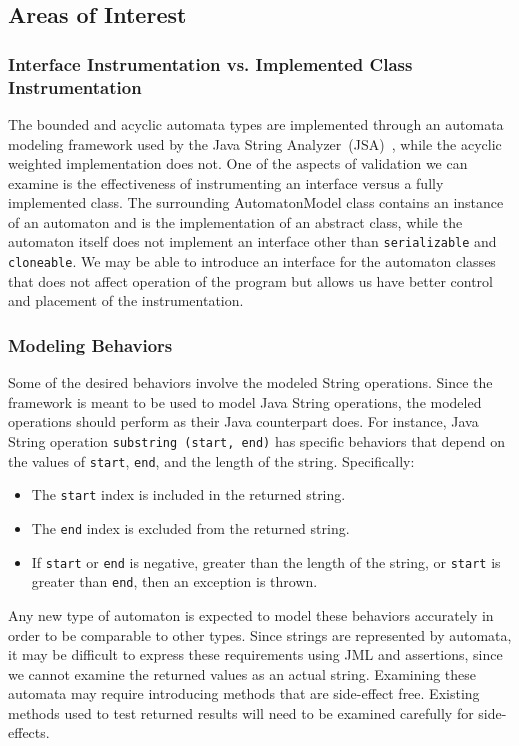 \documentclass[letterpaper,11pt,twocolumn]{article}
\begin{document}
\subsection{Areas of Interest}

\subsubsection{Interface Instrumentation vs. Implemented Class Instrumentation}

The bounded and acyclic automata types are implemented through an automata
modeling framework used by the Java String Analyzer~(JSA)~\cite{strings2003},
while the acyclic weighted implementation does not.  One of the aspects of
validation we can examine is the effectiveness of instrumenting an interface
versus a fully implemented class.  The surrounding AutomatonModel class
contains an instance of an automaton and is the implementation of an abstract
class, while the automaton itself does not implement an interface other than
\texttt{serializable} and \texttt{cloneable}.  We may be able to introduce an
interface for the automaton classes that does not affect operation of the
program but allows us have better control and placement of the
instrumentation.

\subsubsection{Modeling Behaviors}

Some of the desired behaviors involve the modeled String operations. Since the
framework is meant to be used to model Java String operations, the modeled
operations should perform as their Java counterpart does.  For instance, Java
String operation \texttt{substring~(start, end)} has specific behaviors that
depend on the values of \texttt{start}, \texttt{end}, and the length of the
string.  Specifically:

\begin{itemize}
\item{The \texttt{start} index is included in the returned string.}
\item{The \texttt{end} index is excluded from the returned string.}
\item{If \texttt{start} or \texttt{end} is negative, greater than the length of
    the string, or \texttt{start} is greater than \texttt{end}, then an
    exception is thrown.}
\end{itemize}

Any new type of automaton is expected to model these behaviors accurately in
order to be comparable to other types.  Since strings are represented by
automata, it may be difficult to express these requirements using JML and
assertions, since we cannot examine the returned values as an actual string.
Examining these automata may require introducing methods that are side-effect
free.  Existing methods used to test returned results will need to be examined
carefully for side-effects.
\end{document}
